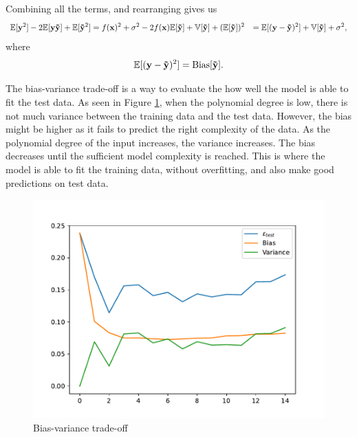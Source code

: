 Combining all the terms, and rearranging gives us
\begin{align*}
    \mathbb{E} [ \mathbf{y}^{2} ] - 2 \mathbb{E} [ \mathbf{y} \mathbf{\Tilde{y}} ] + \mathbb{E} [ \mathbf{\Tilde{y}}^{2} ] &= f(\mathbf{x})^{2} + \sigma^{2} - 2 f(\mathbf{x}) \mathbb{E} [ \mathbf{\Tilde{y}} ] + \mathbb{V}[\mathbf{\Tilde{y}}] + (\mathbb{E} [ \mathbf{\Tilde{y}} ])^{2} 
    &= \mathbb{E} [ (\mathbf{y} - \mathbf{\Tilde{y}})^{2} ] + \mathbb{V}[\mathbf{\Tilde{y}}] + \sigma^{2} , 
\end{align*}
where 
\begin{align*}
    \mathbb{E} [ (\mathbf{y} - \mathbf{\Tilde{y}})^{2} ] = \text{Bias}[\mathbf{\Tilde{y}}]. 
\end{align*}

The bias-variance trade-off is a way to evaluate the how well the model is able to fit the test data. As seen in Figure \ref{fig:bias-variance}, when the polynomial degree is low, there is not much variance between the training data and the test data. However, the bias might be higher as it fails to predict the right complexity of the data. As the polynomial degree of the input increases, the variance increases. The bias decreases until the sufficient model complexity is reached. This is where the model is able to fit the training data, without overfitting, and also make good predictions on test data. 

\begin{figure}
    \centering
    \includegraphics[width=0.5\linewidth]{latex/figures/ex38_noise.pdf}
    \caption{Bias-variance trade-off}
    \label{fig:bias-variance}
\end{figure}